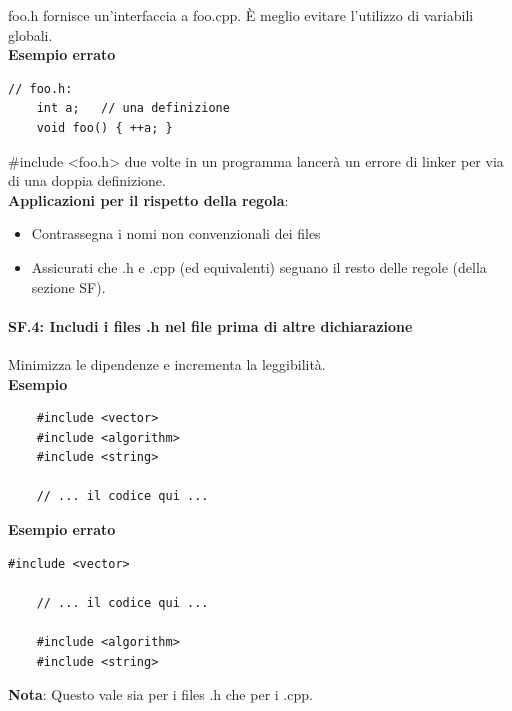 \textsf{\small foo.h fornisce un'interfaccia a foo.cpp. È meglio evitare l'utilizzo di variabili globali.} \\

\textsf{\small \textbf{Esempio errato}}

\begin{lstlisting}[frame=single, rulecolor=\color{red}]
	// foo.h:
	int a;   // una definizione
	void foo() { ++a; }
\end{lstlisting}

\textsf{\small \#include <foo.h> due volte in un programma lancerà un errore di linker per via di una doppia definizione. } \\

\textsf{\small \textbf{Applicazioni per il rispetto della regola}: }

\begin{itemize}
	\item \textsf{\small Contrassegna i nomi non convenzionali dei files}
	\item \textsf{\small Assicurati che .h e .cpp (ed equivalenti) seguano il resto delle regole (della sezione SF).}
\end{itemize}

\paragraph{SF.4: Includi i files .h nel file prima di altre dichiarazione}

\textsf{\small Minimizza le dipendenze e incrementa la leggibilità.} \\

\textsf{\small \textbf{Esempio}}

\begin{lstlisting}
	#include <vector>
	#include <algorithm>
	#include <string>
	
	// ... il codice qui ...
\end{lstlisting}

\textsf{\small \textbf{Esempio errato}}

\begin{lstlisting}[frame=single, rulecolor=\color{red}]
	#include <vector>
	
	// ... il codice qui ...
	
	#include <algorithm>
	#include <string>
\end{lstlisting}

\textsf{\small \textbf{Nota}: Questo vale sia per i files .h che per i .cpp.} \\

